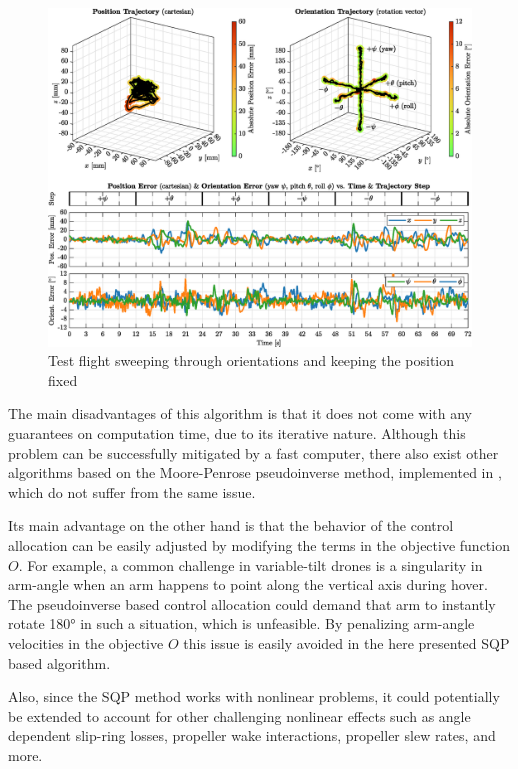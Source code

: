 \documentclass[conference]{IEEEtran}
\begin{document}
\begin{figure}[b!]
	\vspace{12pt}
	\includegraphics[width=\textwidth]{img/4_flight_rot_sweep.eps}
	\centering
	\caption{Test flight sweeping through orientations and keeping the position fixed}
	\label{fig:4_flight_rot_sweep}
	\vspace{-4pt}
\end{figure}
\par
The main disadvantages of this algorithm is that it does not come with any guarantees on computation time, due to its iterative nature. Although this problem can be successfully mitigated by a fast computer, there also exist other algorithms based on the Moore-Penrose pseudoinverse method, implemented in \cite{2020_xu_bicopter, 2019_bodie_omav, 2018_kamel_voliro, 2015_ryll_quadvc, 2013_sequigasco_quadvcd}, which do not suffer from the same issue.
\par
Its main advantage on the other hand is that the behavior of the control allocation can be easily adjusted by modifying the terms in the objective function $O$. For example, a common challenge in variable-tilt drones is a singularity in arm-angle when an arm happens to point along the vertical axis during hover. The pseudoinverse based control allocation could demand that arm to instantly rotate 180° in such a situation, which is unfeasible. By penalizing arm-angle velocities in the objective $O$ this issue is easily avoided in the here presented SQP based algorithm.
\par
Also, since the SQP method works with nonlinear problems, it could potentially be extended to account for other challenging nonlinear effects such as angle dependent slip-ring losses, propeller wake interactions, propeller slew rates, and more.
\end{document}
